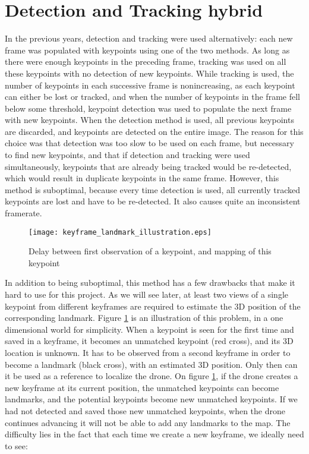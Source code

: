 \section{Detection and Tracking hybrid}

In the previous years, detection and tracking were used alternatively: each new frame was populated with keypoints using one of the two methods. As long as there were enough keypoints in the preceding frame, tracking was used on all these keypoints with no detection of new keypoints. While tracking is used, the number of keypoints in each successive frame is nonincreasing, as each keypoint can either be lost or tracked, and when the number of keypoints in the frame fell below some threshold, keypoint detection was used to populate the next frame with new keypoints. When the detection method is used, all previous keypoints are discarded, and keypoints are detected on the entire image. The reason for this choice was that detection was too slow to be used on each frame, but necessary to find new keypoints, and that if detection and tracking were used simultaneously, keypoints that are already being tracked would be re-detected, which would result in duplicate keypoints in the same frame. However, this method is suboptimal, because every time detection is used, all currently tracked keypoints are lost and have to be re-detected. It also causes quite an inconsistent framerate.\\

\begin{figure}[H]
  \centering
  \texttt{[image: keyframe\_landmark\_illustration.eps]}
  \caption{Delay between first observation of a keypoint, and mapping of this keypoint}
  \label{fig:delay}
\end{figure}

In addition to being suboptimal, this method has a few drawbacks that make it hard to use for this project. As we will see later, at least two views of a single keypoint from different keyframes are required to estimate the 3D position of the corresponding landmark. Figure \ref{fig:delay} is an illustration of this problem, in a one dimensional world for simplicity. When a keypoint is seen for the first time and saved in a keyframe, it becomes an unmatched keypoint (red cross), and its 3D location is unknown. It has to be observed from a second keyframe in order to become a landmark (black cross), with an estimated 3D position. Only then can it be used as a reference to localize the drone. On figure \ref{fig:delay}, if the drone creates a new keyframe at its current position, the unmatched keypoints can become landmarks, and the potential keypoints become new unmatched keypoints. If we had not detected and saved those new unmatched keypoints, when the drone continues advancing it will not be able to add any landmarks to the map. The difficulty lies in the fact that each time we create a new keyframe, we ideally need to see:

